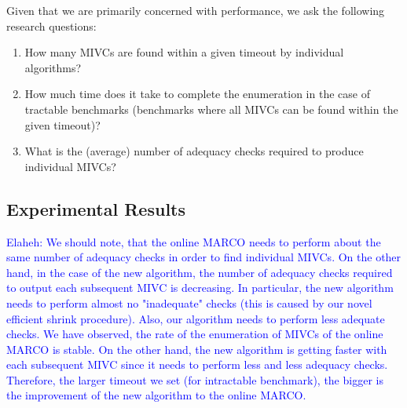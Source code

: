 Given that we are primarily concerned with performance, we ask the following research questions:
\begin{enumerate}
	\item How many MIVCs are found within a given timeout by individual algorithms? %
	\item How much time does it take to complete the enumeration in the case of tractable benchmarks (benchmarks where all MIVCs can be found within the given timeout)? %
	\item What is the (average) number of adequacy checks required to produce individual MIVCs? %
\end{enumerate}

\subsection{Experimental Results}
\textcolor{blue}{Elaheh: We should note, that the online MARCO needs to perform about the same number of adequacy checks in order to find individual MIVCs. On the other hand, in the case of the new algorithm, the number of adequacy checks required to output each subsequent MIVC is decreasing. In particular, the new algorithm needs to perform almost no "inadequate" checks (this is caused by our novel efficient shrink procedure). Also, our algorithm needs to perform less adequate checks. We have observed, the rate of the enumeration of MIVCs of the online MARCO is stable. On the other hand, the new algorithm is getting faster with each subsequent MIVC since it needs to perform less and less adequacy checks. Therefore, the larger timeout we set (for intractable benchmark), the bigger is the improvement of the new algorithm to the online MARCO.}

